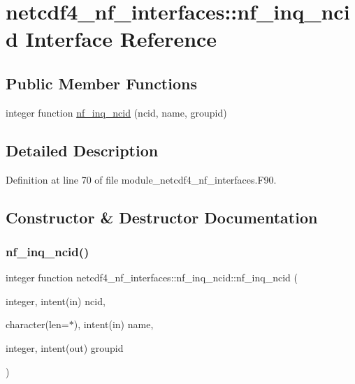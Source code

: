 \hypertarget{interfacenetcdf4__nf__interfaces_1_1nf__inq__ncid}{}\section{netcdf4\+\_\+nf\+\_\+interfaces\+:\+:nf\+\_\+inq\+\_\+ncid Interface Reference}
\label{interfacenetcdf4__nf__interfaces_1_1nf__inq__ncid}
\subsection*{Public Member Functions}
\begin{DoxyCompactItemize}
\item 
integer function \hyperlink{interfacenetcdf4__nf__interfaces_1_1nf__inq__ncid_ad1145b47792a5f2afe5c1a2b370fa2d3}{nf\+\_\+inq\+\_\+ncid} (ncid, name, groupid)
\end{DoxyCompactItemize}


\subsection{Detailed Description}


Definition at line 70 of file module\+\_\+netcdf4\+\_\+nf\+\_\+interfaces.\+F90.



\subsection{Constructor \& Destructor Documentation}
\mbox{\label{interfacenetcdf4__nf__interfaces_1_1nf__inq__ncid_ad1145b47792a5f2afe5c1a2b370fa2d3}} 
\subsubsection{\texorpdfstring{nf\+\_\+inq\+\_\+ncid()}{nf\_inq\_ncid()}}
{\footnotesize\ttfamily integer function netcdf4\+\_\+nf\+\_\+interfaces\+::nf\+\_\+inq\+\_\+ncid\+::nf\+\_\+inq\+\_\+ncid (\begin{DoxyParamCaption}\item[{integer, intent(in)}]{ncid,  }\item[{character(len=$\ast$), intent(in)}]{name,  }\item[{integer, intent(out)}]{groupid }\end{DoxyParamCaption})}



